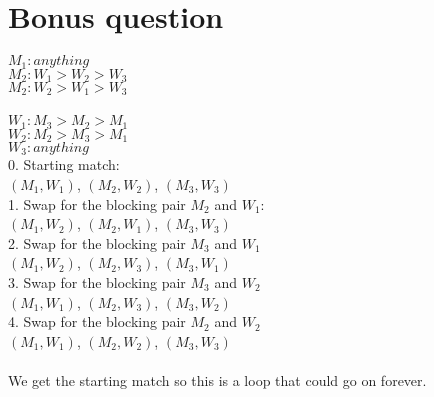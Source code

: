 \documentclass[a4paper]{article}
\begin{document}
\section{Bonus question}
$M_1: anything $ \\
$M_2: W_1 > W_2 > W_3$\\
$M_2: W_2 > W_1 > W_3$\\\\
$W_1: M_3 > M_2 > M_1$\\
$W_2: M_2 > M_3 > M_1$\\
$W_3: anything$\\

0. Starting match: \\
$(M_1, W_1)$, $(M_2, W_2)$, $(M_3, W_3)$ \\
1. Swap for the blocking pair $M_2$ and $W_1$: \\
$(M_1, W_2)$, $(M_2, W_1)$, $(M_3, W_3)$ \\
2. Swap for the blocking pair $M_3$ and $W_1$ \\
$(M_1, W_2)$, $(M_2, W_3)$, $(M_3, W_1)$ \\
3. Swap for the blocking pair $M_3$ and $W_2$ \\
$(M_1, W_1)$, $(M_2, W_3)$, $(M_3, W_2)$ \\
4. Swap for the blocking pair $M_2$ and $W_2$ \\
$(M_1, W_1)$, $(M_2, W_2)$, $(M_3, W_3)$ \\
\\
We get the starting match so this is a loop that could go on forever.
\end{document}
